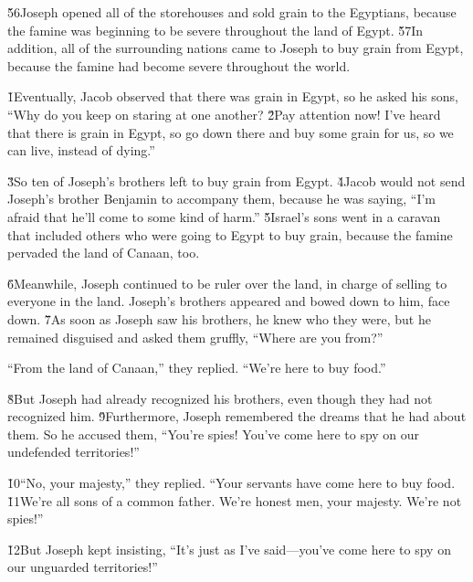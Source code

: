 \v{56}Joseph opened all of the storehouses and sold grain to the Egyptians, because the famine was beginning to be severe throughout the land of Egypt. \v{57}In addition, all of the surrounding nations came to Joseph to buy grain from Egypt, because the famine had become severe throughout the world.

\v{1}Eventually, Jacob observed that there was grain in Egypt, so he asked his sons, ``Why do you keep on staring at one another? \v{2}Pay attention now! I've heard that there is grain in Egypt, so go down there and buy some grain for us, so we can live, instead of dying.''

\v{3}So ten of Joseph's brothers left to buy grain from Egypt. \v{4}Jacob would not send Joseph's brother Benjamin to accompany them, because he was saying, ``I'm afraid that he'll come to some kind of harm.'' \v{5}Israel's sons went in a caravan that included others who were going to Egypt to buy grain, because the famine pervaded the land of Canaan, too.

\v{6}Meanwhile, Joseph continued to be ruler over the land, in charge of selling to everyone in the land. Joseph's brothers appeared and bowed down to him, face down. \v{7}As soon as Joseph saw his brothers, he knew who they were, but he remained disguised and asked them gruffly, ``Where are you from?''

``From the land of Canaan,'' they replied. ``We're here to buy food.''

\v{8}But Joseph had already recognized his brothers, even though they had not recognized him. \v{9}Furthermore, Joseph remembered the dreams that he had about them. So he accused them, ``You're spies! You've come here to spy on our undefended territories!''

\v{10}``No, your majesty,'' they replied. ``Your servants have come here to buy food. \v{11}We're all sons of a common father. We're honest men, your majesty. We're not spies!''

\v{12}But Joseph kept insisting, ``It's just as I've said---you've come here to spy on our unguarded territories!''

